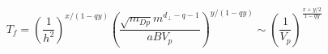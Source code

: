 \begin{equation}
T_f = \left (\frac{1}{h^2} \right )^{x/(1-qy)}
\left ( \frac{\sqrt{m_{Dp}}m^{d_\perp-q-1}}{aB V_p}\right )^{y/(1-qy)} \sim
\left (\frac{1}{V_p}\right)^{\frac{x+y/2}{1-qy}}
\label{tfinal}
\end{equation}

